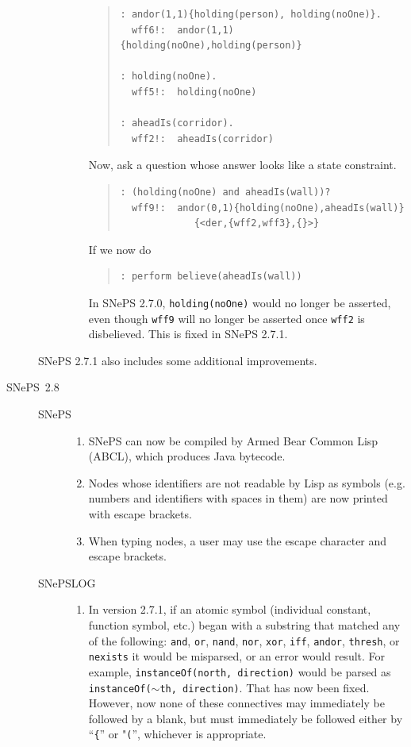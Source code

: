 \documentclass{book}
\begin{document}
\begin{description}
\begin{description}
\begin{enumerate}
\begin{quote}
\begin{verbatim}
: andor(1,1){holding(person), holding(noOne)}.
  wff6!:  andor(1,1){holding(noOne),holding(person)}    

: holding(noOne).
  wff5!:  holding(noOne)    

: aheadIs(corridor).
  wff2!:  aheadIs(corridor)    
\end{verbatim}
\end{quote}
Now, ask a question whose answer looks like a state constraint.
\begin{quote}
\begin{verbatim}
: (holding(noOne) and aheadIs(wall))?
  wff9!:  andor(0,1){holding(noOne),aheadIs(wall)}
             {<der,{wff2,wff3},{}>}  
\end{verbatim}
\end{quote}
If we now do
\begin{quote}
\begin{verbatim}
: perform believe(aheadIs(wall))
\end{verbatim}
\end{quote}
In SNePS 2.7.0, \texttt{holding(noOne)} would no longer be asserted, even though
\texttt{wff9} will no longer be asserted once \texttt{wff2} is
disbelieved. This is fixed in SNePS 2.7.1.
\end{enumerate}
  \end{description}
SNePS 2.7.1 also includes some additional improvements.

\item[SNePS~2.8]\mbox{}
  \begin{description}
  \item[SNePS]\mbox{}
    \begin{enumerate}
    \item SNePS can now be compiled by Armed Bear Common Lisp (ABCL), which
       produces Java bytecode.
     \item Nodes whose identifiers are not readable by Lisp as symbols
       (e.g. numbers and identifiers with spaces in them) are now printed with
       escape brackets.
     \item When typing nodes, a user may use the escape character and escape
       brackets.
    \end{enumerate}

  \item[SNePSLOG]\mbox{}
\begin{enumerate}
\item In version 2.7.1, if an atomic symbol (individual constant, function
  symbol, etc.) began with a substring that matched any of the following:
  \texttt{and}, \texttt{or}, \texttt{nand}, \texttt{nor}, \texttt{xor},
  \texttt{iff}, \texttt{andor}, \texttt{thresh}, or \texttt{nexists} it would be
  misparsed, or an error would result.  For example, \texttt{instanceOf(north,
    direction)} would be parsed as\\ \texttt{instanceOf($\sim$th, direction)}.  That
  has now been fixed.  However, now none of these connectives may immediately be
  followed by a blank, but must immediately be followed either by
  ``\texttt{\{}'' or "\texttt{(}'', whichever is appropriate.


\end{enumerate}
\end{description}
\end{description}
\end{document}
